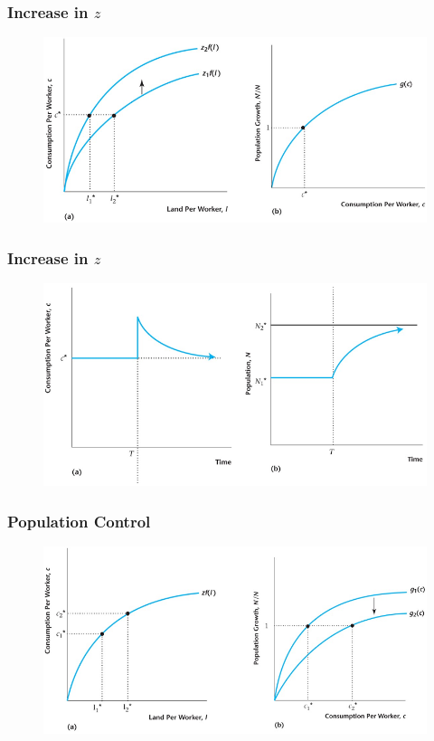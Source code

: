 \documentclass{beamer}
\begin{document}
\begin{frame}
\frametitle[alignment=center]{Increase in $z$}
\begin{figure}
\centering
\includegraphics[scale=0.5]{Figures/W_Fig_7pt9.png}
\end{figure}
\end{frame}



\begin{frame}
\frametitle[alignment=center]{Increase in $z$}
\begin{figure}
\centering
\includegraphics[scale=0.5]{Figures/W_Fig_7pt10.png}
\end{figure}
\end{frame}

\begin{frame}
\frametitle[alignment=center]{Population Control}
\begin{figure}
\centering
\includegraphics[scale=0.5]{Figures/W_Fig_7pt11.png}
\end{figure}
\end{frame}
\end{document}
